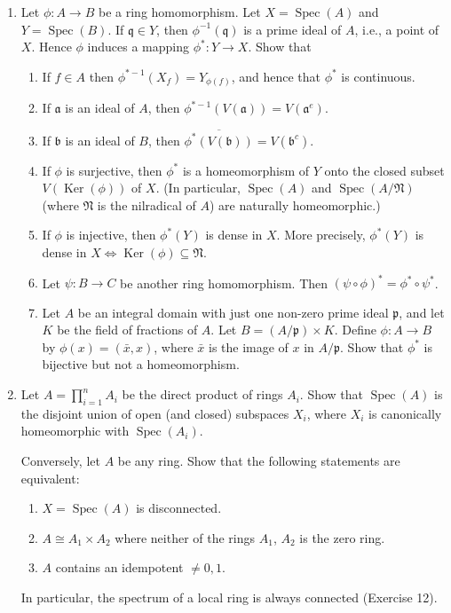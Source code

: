 \begin{enumerate}
\item Let $\phi:A\longrightarrow B$ be a ring homomorphism. Let $X=\operatorname{Spec}(A)$ and $Y=\operatorname{Spec}(B)$. If $\mathfrak q\in Y$, then $\phi^{-1}(\mathfrak q)$ is a prime ideal of $A$, i.e., a point of $X$. Hence $\phi$ induces a mapping $\phi^*:Y\longrightarrow X$. Show that
\begin{enumerate}
\renewcommand{\labelenumii}{\roman{enumii})}
\item If $f\in A$ then $\phi^{*-1}(X_f)=Y_{\phi(f)}$, and hence that $\phi^*$ is continuous.
\item If $\mathfrak a$ is an ideal of $A$, then $\phi^{*-1}(V(\mathfrak a))=V(\mathfrak a^e)$.
\item If $\mathfrak b$ is an ideal of $B$, then $\overline{\phi^*(V(\mathfrak b))}=V(\mathfrak b^c)$.
\item If $\phi$ is surjective, then $\phi^*$ is a homeomorphism of $Y$ onto the closed subset $V(\operatorname{Ker}(\phi))$ of $X$. (In particular, $\operatorname{Spec}(A)$ and $\operatorname{Spec}(A/\mathfrak N)$ (where $\mathfrak N$ is the nilradical of $A$) are naturally homeomorphic.)
\item If $\phi$ is injective, then $\phi^*(Y)$ is dense in $X$. More precisely, $\phi^*(Y)$ is dense in $X\Longleftrightarrow\operatorname{Ker}(\phi)\subseteq\mathfrak N$.
\item Let $\psi:B\longrightarrow C$ be another ring homomorphism. Then $(\psi\circ\phi)^*=\phi^*\circ\psi^*$.
\item Let $A$ be an integral domain with just one non-zero prime ideal $\mathfrak p$, and let $K$ be the field of fractions of $A$. Let $B=(A/\mathfrak p)\times K$. Define $\phi:A\longrightarrow B$ by $\phi(x)=(\bar x,x)$, where $\bar x$ is the image of $x$ in $A/\mathfrak p$. Show that $\phi^*$ is bijective but not a homeomorphism.
\end{enumerate}

\item Let $A=\prod_{i=1}^n A_i$ be the direct product of rings $A_i$. Show that $\operatorname{Spec}(A)$ is the disjoint union of open (and closed) subspaces $X_i$, where $X_i$ is canonically homeomorphic with $\operatorname{Spec}(A_i)$.

Conversely, let $A$ be any ring. Show that the following statements are equivalent:
\begin{enumerate}
\renewcommand{\labelenumii}{\roman{enumii})}
\item $X=\operatorname{Spec}(A)$ is disconnected.
\item $A\cong A_1\times A_2$ where neither of the rings $A_1$, $A_2$ is the zero ring.
\item $A$ contains an idempotent $\neq0,1$.
\end{enumerate}
In particular, the spectrum of a local ring is always connected (Exercise 12).


\end{enumerate}
